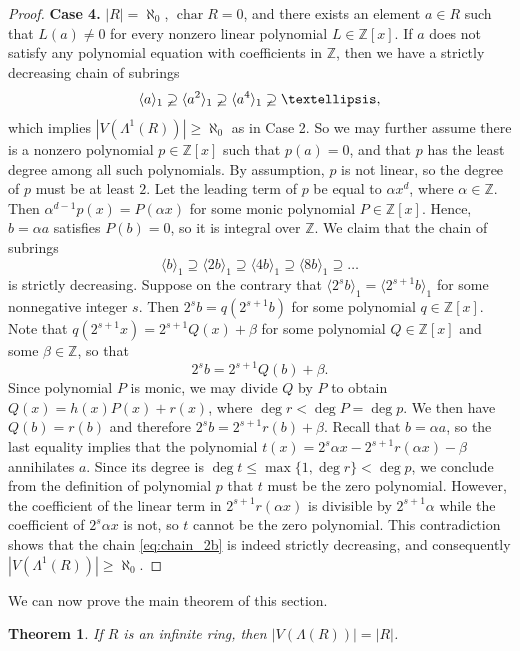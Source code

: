 \documentclass[12pt,a4paper]{amsart}
\newtheorem{theorem}[proposition]{Theorem}
\theoremstyle{definition}
\newcommand{\Z}{\mathbb{Z}}
\DeclareMathOperator{\ch}{char}
\newcommand{\rng}[1]{\langle #1 \rangle}
\begin{document}
\begin{proof}
    \medskip
    {\bf Case 4.} $|R|=\aleph_0$, $\ch R = 0$, and there exists an element $a\in R$ such that $L(a) \neq 0$ for every nonzero linear polynomial $L \in \Z[x]$.
    If $a$ does not satisfy any polynomial equation with coefficients in $\Z$, then we have a strictly decreasing chain of subrings
    $$\rng{a}_1 \varsupsetneq \rng{a^2}_1 \varsupsetneq \rng{a^4}_1 \varsupsetneq \ldots,$$
    which implies $|V(\Lambda^1(R))|\geq \aleph_0$ as in Case 2.
    So we may further assume there is a nonzero polynomial $p \in \Z[x]$ such that $p(a)=0$, and that $p$ has the least degree among all such polynomials. 
    By assumption, $p$ is not linear, so the degree of $p$ must be at least $2$.
    Let the leading term of $p$ be equal to $\alpha x^d$, where $\alpha \in \Z$. Then $\alpha^{d-1}p(x)=P(\alpha x)$ for some monic polynomial $P \in \Z[x]$.
    Hence, $b=\alpha a$ satisfies $P(b)=0$, so it is integral over $\Z$.
    We claim that the chain of subrings
    \begin{equation} \label{eq:chain_2b}
    \rng{b}_1 \supseteq \rng{2b}_1 \supseteq \rng{4b}_1 \supseteq \rng{8b}_1 \supseteq \ldots
    \end{equation}
    is strictly decreasing.
    Suppose on the contrary that $\rng{2^sb}_1=\rng{2^{s+1}b}_1$ for some nonnegative integer $s$.
    Then $2^sb=q(2^{s+1}b)$ for some polynomial $q \in\Z[x]$.
    Note that $q(2^{s+1}x)=2^{s+1}Q(x)+\beta$ for some polynomial $Q \in \Z[x]$ and some $\beta \in \Z$, so that
    $$2^sb=2^{s+1}Q(b)+\beta.$$
    Since polynomial $P$ is monic, we may divide $Q$ by $P$ to obtain
    $Q(x)=h(x)P(x)+r(x)$, where $\deg r<\deg P =\deg p$.
    We then have $Q(b)=r(b)$ and therefore $2^sb=2^{s+1}r(b)+\beta$.
    Recall that $b=\alpha a$, so the last equality implies that the polynomial $t(x)=2^s \alpha x - 2^{s+1}r(\alpha x)-\beta$ annihilates $a$.
    Since its degree is $\deg t \leq \max \{1,\deg r\}<\deg p$, we conclude from the definition of polynomial $p$ that $t$ must be the zero polynomial.
    However, the coefficient of the linear term in $2^{s+1}r(\alpha x)$ is divisible by $2^{s+1}\alpha$ while the coefficient of $2^s \alpha x$ is not, so $t$ cannot be the zero polynomial.
    This contradiction shows that the chain \eqref{eq:chain_2b} is indeed strictly decreasing, and consequently $|V(\Lambda^1(R))|\geq \aleph_0$.
\end{proof}

We can now prove the main theorem of this section.

\begin{theorem}\label{thm:inf_ring}
    If $R$ is an infinite ring, then $|V(\Lambda(R))|=|R|$.
\end{theorem}
\end{document}
